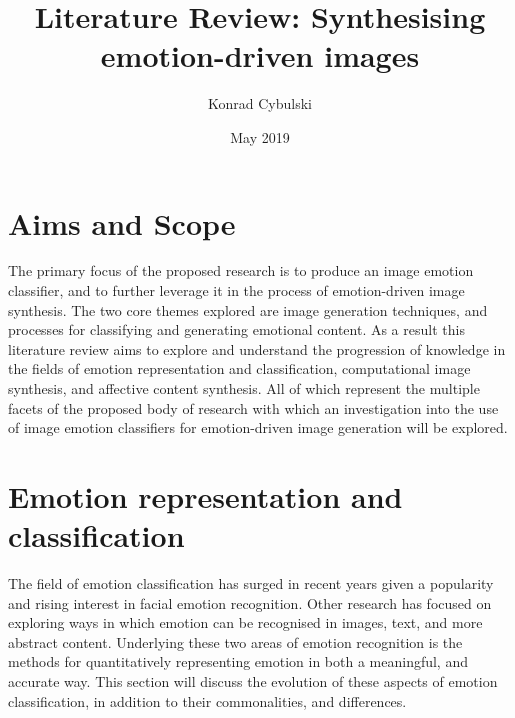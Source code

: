 \documentclass{article}
\title{Literature Review: Synthesising emotion-driven images}
\author{Konrad Cybulski}
\date{May 2019}
\begin{document}
	
\maketitle

\section{Aims and Scope}

The primary focus of the proposed research is to produce an image emotion classifier, and to further leverage it in the process of emotion-driven image synthesis.
The two core themes explored are image generation techniques, and processes for classifying and generating emotional content.
As a result this literature review aims to explore and understand the progression of knowledge in the fields of emotion representation and classification, computational image synthesis, and affective content synthesis.
All of which represent the multiple facets of the proposed body of research with which an investigation into the use of image emotion classifiers for emotion-driven image generation will be explored.

\section{Emotion representation and classification}

The field of emotion classification has surged in recent years given a popularity and rising interest in facial emotion recognition.
Other research has focused on exploring ways in which emotion can be recognised in images, text, and more abstract content.
Underlying these two areas of emotion recognition is the methods for quantitatively representing emotion in both a meaningful, and accurate way.
This section will discuss the evolution of these aspects of emotion classification, in addition to their commonalities, and differences.
\end{document}
